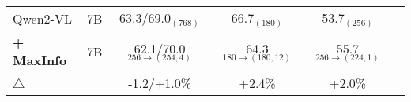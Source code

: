 \begin{table*}[h]
\begin{center}
\begin{footnotesize}
\begin{sc}
{\begin{tabular}{lccccc}
\midrule
Qwen2-VL \cite{qwen2-vl} & 7B & 63.3/69.0$_{(768)}$ & 66.7$_{(180)}$ & 53.7$_{(256)}$ \\
\textbf{+ MaxInfo} & 7B & 62.1/70.0$_{256 \rightarrow (254, 4)}$ & 64.3$_{180 \rightarrow (180, 12)}$ & 55.7$_{256 \rightarrow (224, 1)}$ \\

\rowcolor{lightlightgray} $\triangle$ & & {\scriptsize \color{blue}-1.2/\color{red}+1.0\%} & {\scriptsize \color{red}+2.4\%} & {\scriptsize \color{red}+2.0\%} \\



\bottomrule
\end{tabular}}
\end{sc}
\end{footnotesize}
\end{center}
\vskip -0.1in
\end{table*}
